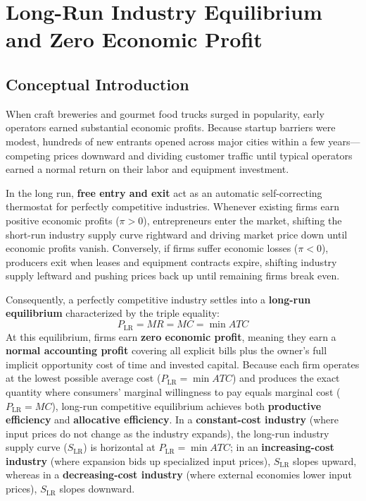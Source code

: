 \documentclass[11pt,letterpaper]{article}
\begin{document}
\section{Long-Run Industry Equilibrium and Zero Economic Profit}

\subsection*{Conceptual Introduction}
When craft breweries and gourmet food trucks surged in popularity, early operators earned substantial economic profits. Because startup barriers were modest, hundreds of new entrants opened across major cities within a few years—competing prices downward and dividing customer traffic until typical operators earned a normal return on their labor and equipment investment.

In the long run, \textbf{free entry and exit} act as an automatic self-correcting thermostat for perfectly competitive industries. Whenever existing firms earn positive economic profits ($\pi > 0$), entrepreneurs enter the market, shifting the short-run industry supply curve rightward and driving market price down until economic profits vanish. Conversely, if firms suffer economic losses ($\pi < 0$), producers exit when leases and equipment contracts expire, shifting industry supply leftward and pushing prices back up until remaining firms break even.

Consequently, a perfectly competitive industry settles into a \textbf{long-run equilibrium} characterized by the triple equality:
\begin{equation}
P_{\text{LR}} = MR = MC = \min ATC
\end{equation}
At this equilibrium, firms earn \textbf{zero economic profit}, meaning they earn a \textbf{normal accounting profit} covering all explicit bills plus the owner's full implicit opportunity cost of time and invested capital. Because each firm operates at the lowest possible average cost ($P_{\text{LR}} = \min ATC$) and produces the exact quantity where consumers' marginal willingness to pay equals marginal cost ($P_{\text{LR}} = MC$), long-run competitive equilibrium achieves both \textbf{productive efficiency} and \textbf{allocative efficiency}. In a \textbf{constant-cost industry} (where input prices do not change as the industry expands), the long-run industry supply curve ($S_{\text{LR}}$) is horizontal at $P_{\text{LR}} = \min ATC$; in an \textbf{increasing-cost industry} (where expansion bids up specialized input prices), $S_{\text{LR}}$ slopes upward, whereas in a \textbf{decreasing-cost industry} (where external economies lower input prices), $S_{\text{LR}}$ slopes downward.
\end{document}
